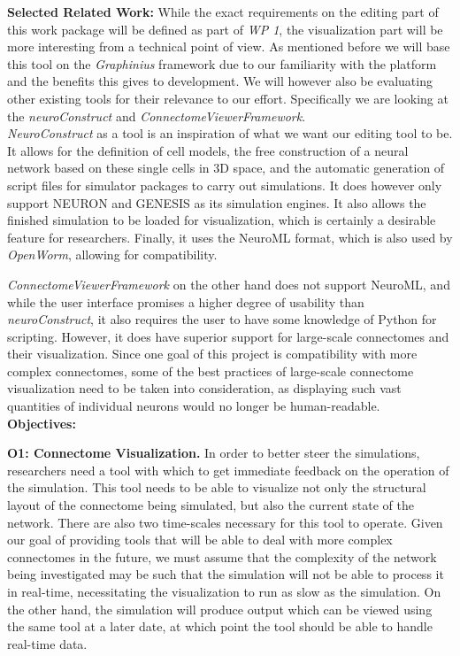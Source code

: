 \documentclass[a4paper,11pt]{article}
\begin{document}
\textbf{Selected Related Work:}
While the exact requirements on the editing part of this work package will be defined as part of \emph{WP 1}, the visualization part will be more interesting from a technical point of view.
As mentioned before we will base this tool on the \emph{Graphinius} framework  due to our familiarity with the platform and the benefits this gives to development.  We will however also be evaluating other existing tools for their relevance to our effort. Specifically we are looking at the \emph{neuroConstruct} and \emph{ConnectomeViewerFramework}.\\

\emph{NeuroConstruct} \citep{Gleeson2007} as a tool is an inspiration of what we want our editing tool to be. It allows for the definition of cell models, the free construction of a neural network based on these single cells in 3D space, and the automatic generation of script files for simulator packages to carry out simulations. It does however only support NEURON \citep{Hines1994} and GENESIS \citep{Bower2003} as its simulation engines. It also allows the finished simulation to be loaded for visualization, which is certainly a desirable feature for researchers. Finally, it uses the NeuroML format, which is also used by \emph{OpenWorm}, allowing for compatibility. 

\emph{ConnectomeViewerFramework} \citep{Gerhard2011} on the other hand does not support NeuroML, and while the user interface promises a higher degree of usability than \emph{neuroConstruct}, it also requires the user to have some knowledge of Python for scripting. However, it does have superior support for large-scale connectomes and their visualization. Since one goal of this project is compatibility with more complex connectomes, some of the best practices of large-scale connectome visualization need to be taken into consideration, as displaying such vast quantities of individual neurons would no longer be human-readable.
\\[0,2cm]

\textbf{Objectives:}

\textbf{O1: Connectome Visualization.}
In order to better steer the simulations, researchers need a tool with which to get immediate feedback on the operation of the simulation. This tool needs to be able to visualize not only the structural layout of the connectome being simulated, but also the current state of the network.
There are also two time-scales necessary for this tool to operate. Given our goal of providing tools that will be able to deal with more complex connectomes in the future, we must assume that the complexity of the network being investigated may be such that the simulation will not be able to process it in real-time, necessitating the visualization to run as slow as the simulation. On the other hand, the simulation will produce output which can be viewed using the same tool at a later date, at which point the tool should be able to handle real-time data.
\\[0,2cm]
\end{document}
